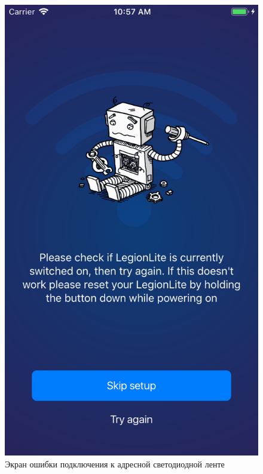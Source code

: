 \begin{figure}[H]
\centering
	\includegraphics[scale=0.2]{figures/userGuide/failedLoading.png}
	\caption{Экран ошибки подключения к адресной светодиодной ленте}
	\label{fig:develop:userGuide:failedLoading}
\end{figure}

